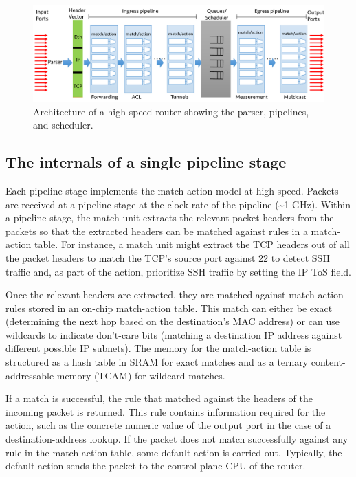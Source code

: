 \begin{figure}[!t]
\includegraphics[width=\textwidth]{detailed_pipeline.pdf}
\caption{Architecture of a high-speed router showing the parser, pipelines, and scheduler.}
\label{fig:detailed_pipeline}
\end{figure}

\subsection{The internals of a single pipeline stage}
\label{ss:internal_pipeline_stage}
Each pipeline stage
implements the match-action model at high speed. Packets are received at a
pipeline stage at the clock rate of the pipeline (\textasciitilde1 GHz).
Within a pipeline stage, the match unit extracts the relevant packet headers
from the packets so that the extracted headers can be matched against rules
 in a match-action table. For instance, a match unit might extract the
TCP headers out of all the packet headers to match the TCP's source port
against 22 to detect SSH traffic and, as part of the action, prioritize SSH
traffic by setting the IP ToS field.

Once the relevant headers are extracted, they are matched against match-action
rules stored in an on-chip match-action table. This match can either be exact
(\eg determining the next hop based on the destination's MAC address) or can
use wildcards to indicate don't-care bits (\eg matching a destination IP
address against different possible IP subnets). The memory for the match-action
table is structured as a hash table in SRAM for exact matches and as a
ternary content-addressable memory (TCAM) for wildcard matches.

If a match is successful, the rule that matched against the headers of the
incoming packet is returned. This rule contains information
required for the action, such as the concrete numeric value of the output port
in the case of a destination-address lookup. If the packet does not match
successfully against any rule in the match-action table, some default action is
carried out. Typically, the default action sends the packet to the control
plane CPU of the router.

